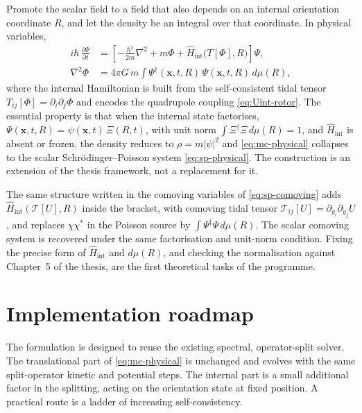\documentclass[11pt,a4paper]{article}
\begin{document}
Promote the scalar field to a field that also depends on an internal orientation
coordinate $R$, and let the density be an integral over that coordinate. In physical
variables,
%
\begin{align}
  i\hbar\,\frac{\partial \Psi}{\partial t}
  &= \left[ -\frac{\hbar^2}{2m}\nabla^2 + m\Phi
  + \hat{H}_{\mathrm{int}}\bigl(T[\Phi],R\bigr) \right]\Psi,
  \label{eq:mc-physical}\\
  \nabla^2\Phi &= 4\pi G\,m \int \Psi^{\dagger}(\mathbf{x},t,R)\,\Psi(\mathbf{x},t,R)\,
  d\mu(R),
\end{align}
%
where the internal Hamiltonian is built from the self-consistent tidal tensor
$T_{ij}[\Phi] = \partial_i\partial_j\Phi$ and encodes the quadrupole coupling
\eqref{eq:Uint-rotor}. The essential property is that when the internal state
factorises, $\Psi(\mathbf{x},t,R) = \psi(\mathbf{x},t)\,\Xi(R,t)$, with unit norm
$\int \Xi^{\dagger}\Xi\,d\mu(R) = 1$, and $\hat{H}_{\mathrm{int}}$ is absent or frozen,
the density reduces to $\rho = m|\psi|^2$ and \eqref{eq:mc-physical} collapses to the
scalar Schr\"odinger--Poisson system \eqref{eq:sp-physical}. The construction is an
extension of the thesis framework, not a replacement for it.

The same structure written in the comoving variables of \eqref{eq:sp-comoving} adds
$\hat{H}_{\mathrm{int}}(\mathcal{T}[U],R)$ inside the bracket, with comoving tidal tensor
$\mathcal{T}_{ij}[U] = \partial_{y_i}\partial_{y_j}U$, and replaces $\chi\chi^{\ast}$ in
the Poisson source by $\int \Psi^{\dagger}\Psi\,d\mu(R)$. The scalar comoving system is
recovered under the same factorisation and unit-norm condition. Fixing the precise form
of $\hat{H}_{\mathrm{int}}$ and $d\mu(R)$, and checking the normalisation against
Chapter~5 of the thesis, are the first theoretical tasks of the programme.

\section{Implementation roadmap}
\label{sec:roadmap}

The formulation is designed to reuse the existing spectral, operator-split solver. The
translational part of \eqref{eq:mc-physical} is unchanged and evolves with the same
split-operator kinetic and potential steps. The internal part is a small additional
factor in the splitting, acting on the orientation state at fixed position. A practical
route is a ladder of increasing self-consistency.
\end{document}
